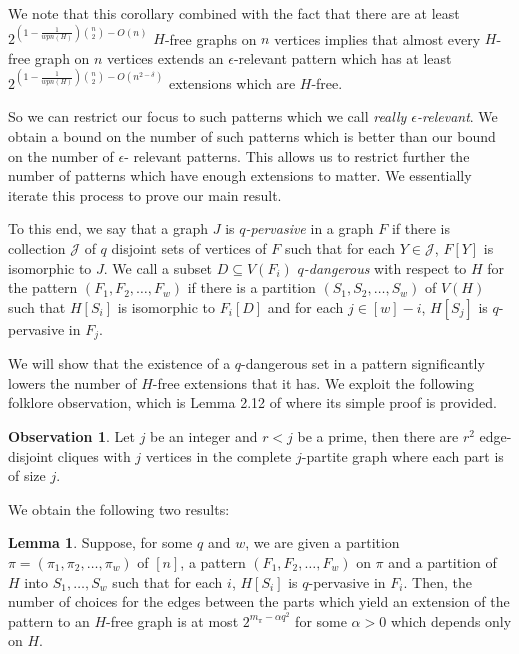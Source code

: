 \documentclass[12pt]{article}
\theoremstyle{definition}
\newtheorem{lemma}[theorem]{Lemma}
\newtheorem{observation}[theorem]{\textbf{Observation}}
\newcommand\cJ{\mathcal J}
\begin{document}
We note that this corollary combined with the fact that there are at least  $2^{(1-\frac{1}{wpn(H)}){n \choose 2}-O(n)}$
$H$-free graphs on $n$ vertices implies that almost every $H$-free graph on $n$ vertices extends an $\epsilon$-relevant pattern which 
has at least  $2^{(1-\frac{1}{wpn(H)}){n \choose 2}-O(n^{2-\delta})}$ extensions which are $H$-free. 

 So we can restrict our focus to such  patterns which we call {\it really $\epsilon$-relevant}. We obtain a bound on  the number of such patterns
 which is better than our bound on the number of $\epsilon$- relevant patterns. This   allows us to restrict further the number of 
 patterns which  have enough extensions to matter. We essentially iterate this process to prove our 
 main result. 

To this end, we say that a graph $J$ is {\it  $q$-pervasive} in a graph $F$  if there is collection $\cJ$ of $q$ disjoint sets of vertices of $F$ such that for each $Y\in \cJ$, $F[Y]$ is isomorphic to $J$. We call a subset $D \subseteq V(F_i)$  {\it $q$-dangerous} with respect to $H$ for the pattern $(F_1,F_2,\ldots,F_w)$ if there is a partition $(S_1,S_2,\ldots,S_w)$ of $V(H)$ such that $H[S_i]$ is isomorphic to $F_i[D]$ and  for each $j \in [w]-i$, $H[S_j]$ is $q$-pervasive in $F_j$.

We will show that the existence of a $q$-dangerous set in a pattern significantly lowers the number of $H$-free 
extensions that it has.  We exploit the following folklore observation, which is Lemma 2.12 of \cite{BB11} where 
its simple  proof is provided.     

\begin{observation}\label{lemma:edgedisK}
  Let $j$ be an integer and $r<j$ be a prime, then there are  $r^2$ edge-disjoint cliques with  $j$ vertices 
 in the complete $j$-partite graph where each part is of size $j$.   
\end{observation}

We obtain the following two results:  


\begin{lemma}
Suppose, for some $q$ and $w$, we are given a partition $\pi=(\pi_1,\pi_2,\ldots,\pi_w)$ of $[n]$, a pattern $(F_1,F_2,\ldots,F_w)$ on $\pi$ and  a partition of $H$ into $S_1,\ldots,S_w$ such that for each $i$, $H[S_i]$ is 
$q$-pervasive in $F_i$. Then,  the number of choices for the edges between
the parts which yield an extension of the pattern to an $H$-free graph is at most $2^{m_\pi-\alpha  q^2}$ for some $\alpha>0$ which depends only on $H$. 
\end{lemma}
\end{document}
